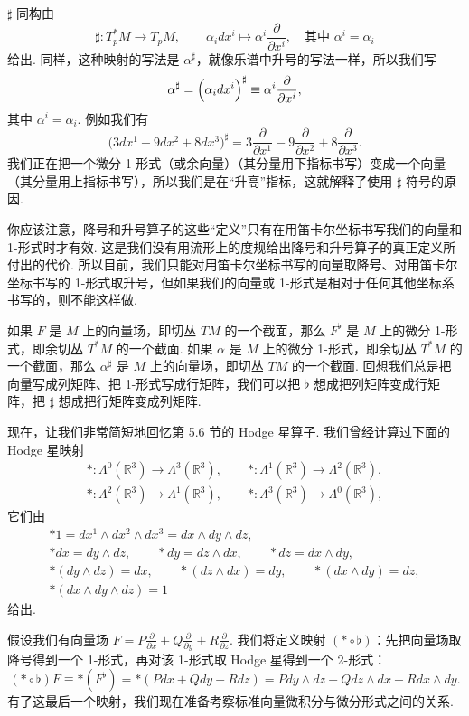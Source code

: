 $\sharp$ 同构由
\[
\sharp:T_p^*M\longrightarrow T_pM,\qquad \alpha_idx^i\longmapsto\alpha^i\frac{\partial}{\partial x^i},\quad\text{其中 }\alpha^i=\alpha_i
\]
给出. 同样，这种映射的写法是 $\alpha^{\sharp}$，就像乐谱中升号的写法一样，所以我们写
\[
\alpha^{\sharp}=\Bigl(\alpha_idx^i\Bigr)^{\sharp}\equiv\alpha^i\frac{\partial}{\partial x^i},
\]
其中 $\alpha^i=\alpha_i$. 例如我们有
\[
\bigl(3dx^1-9dx^2+8dx^3\bigr)^{\sharp}=3\frac{\partial}{\partial x^1}-9\frac{\partial}{\partial x^2}+8\frac{\partial}{\partial x^3}.
\]
我们正在把一个微分 1-形式（或余向量）（其分量用下指标书写）变成一个向量（其分量用上指标书写），所以我们是在``升高''指标，这就解释了使用 $\sharp$ 符号的原因.

你应该注意，降号和升号算子的这些``定义''只有在用笛卡尔坐标书写我们的向量和 1-形式时才有效. 这是我们没有用流形上的度规给出降号和升号算子的真正定义所付出的代价. 所以目前，我们只能对用笛卡尔坐标书写的向量取降号、对用笛卡尔坐标书写的 1-形式取升号，但如果我们的向量或 1-形式是相对于任何其他坐标系书写的，则不能这样做.

如果 $F$ 是 $M$ 上的向量场，即切丛 $TM$ 的一个截面，那么 $F^{\flat}$ 是 $M$ 上的微分 1-形式，即余切丛 $T^*M$ 的一个截面. 如果 $\alpha$ 是 $M$ 上的微分 1-形式，即余切丛 $T^*M$ 的一个截面，那么 $\alpha^{\sharp}$ 是 $M$ 上的向量场，即切丛 $TM$ 的一个截面. 回想我们总是把向量写成列矩阵、把 1-形式写成行矩阵，我们可以把 $\flat$ 想成把列矩阵变成行矩阵，把 $\sharp$ 想成把行矩阵变成列矩阵.

现在，让我们非常简短地回忆第 5.6 节的 Hodge 星算子. 我们曾经计算过下面的 Hodge 星映射
\begin{align*}
\ast:\Lambda^0(\mathbb{R}^3)\longrightarrow\Lambda^3(\mathbb{R}^3),\qquad
\ast:\Lambda^1(\mathbb{R}^3)\longrightarrow\Lambda^2(\mathbb{R}^3), \\
\ast:\Lambda^2(\mathbb{R}^3)\longrightarrow\Lambda^1(\mathbb{R}^3),\qquad
\ast:\Lambda^3(\mathbb{R}^3)\longrightarrow\Lambda^0(\mathbb{R}^3),
\end{align*}
它们由
\begin{align*}
\ast 1=dx^1\wedge dx^2\wedge dx^3=dx\wedge dy\wedge dz, \\
\ast dx=dy\wedge dz,\qquad\ast dy=dz\wedge dx,\qquad\ast dz=dx\wedge dy, \\
\ast(dy\wedge dz)=dx,\qquad\ast(dz\wedge dx)=dy,\qquad\ast(dx\wedge dy)=dz, \\
\ast(dx\wedge dy\wedge dz)=1
\end{align*}
给出.

假设我们有向量场 $F=P\frac{\partial}{\partial x}+Q\frac{\partial}{\partial y}+R\frac{\partial}{\partial z}$. 我们将定义映射 $(\ast\circ\flat)$：先把向量场取降号得到一个 1-形式，再对该 1-形式取 Hodge 星得到一个 2-形式：
\[
(\ast\circ\flat)F\equiv\ast(F^{\flat})=\ast(Pdx+Qdy+Rdz)=Pdy\wedge dz+Qdz\wedge dx+Rdx\wedge dy.
\]
有了这最后一个映射，我们现在准备考察标准向量微积分与微分形式之间的关系.

